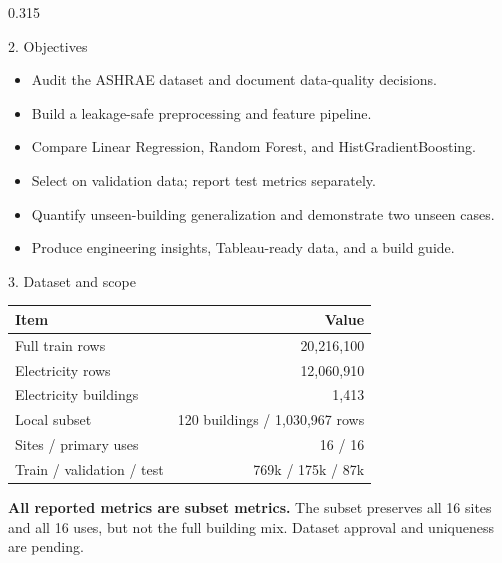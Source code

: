\documentclass[final]{beamer}
\begin{document}
\begin{frame}[t]
\begin{columns}[t]
\begin{column}{0.315\paperwidth}
\begin{block}{2. Objectives}
\begin{itemize}
\item Audit the ASHRAE dataset and document data-quality decisions.
\item Build a leakage-safe preprocessing and feature pipeline.
\item Compare Linear Regression, Random Forest, and HistGradientBoosting.
\item Select on validation data; report test metrics separately.
\item Quantify unseen-building generalization and demonstrate two unseen cases.
\item Produce engineering insights, Tableau-ready data, and a build guide.
\end{itemize}
\end{block}

\begin{block}{3. Dataset and scope}
\begin{center}
\begin{tabular}{lr}
\toprule
Item & Value\\
\midrule
Full train rows & 20,216,100\\
Electricity rows & 12,060,910\\
Electricity buildings & 1,413\\
Local subset & 120 buildings / 1,030,967 rows\\
Sites / primary uses & 16 / 16\\
Train / validation / test & 769k / 175k / 87k\\
\bottomrule
\end{tabular}
\end{center}
\begin{tcolorbox}[colback=paleteal,colframe=teal,boxrule=1pt,arc=2pt,left=4pt,right=4pt,top=3pt,bottom=3pt]
\small\textbf{All reported metrics are subset metrics.} The subset preserves all 16 sites and all 16 uses, but not the full building mix. Dataset approval and uniqueness are pending.
\end{tcolorbox}
\end{block}


\end{column}
\end{columns}
\end{frame}
\end{document}
